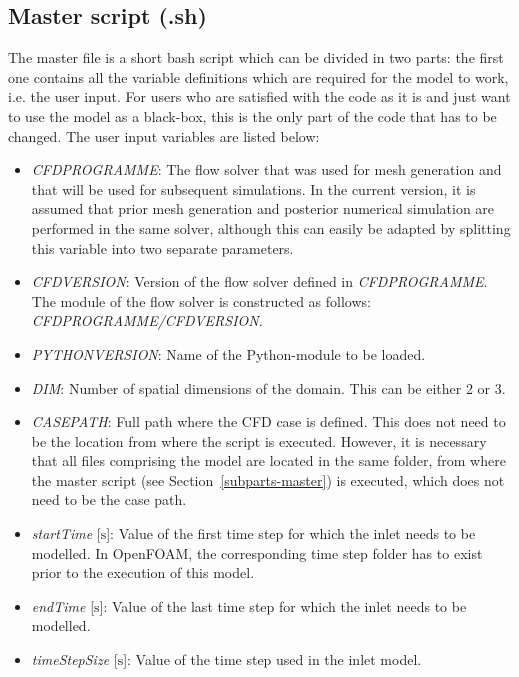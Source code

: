 \documentclass[fleqn,10pt,a4paper,twoside,english]{book}
\begin{document}
\subsection{Master script (.sh) \label{subparts-master}}
The master file is a short bash script which can be divided in two parts: the first one contains all the variable definitions which are required for the model to work, i.e. the user input. For users who are satisfied with the code as it is and just want to use the model as a black-box, this is the only part of the code that has to be changed. The user input variables are listed below:
\begin{itemize}
	\item{\textit{CFD\textunderscore PROGRAMME}: The flow solver that was used for mesh generation and that will be used for subsequent simulations. In the current version, it is assumed that prior mesh generation and posterior numerical simulation are performed in the same solver, although this can easily be adapted by splitting this variable into two separate parameters.}
	\item{\textit{CFD\textunderscore VERSION}: Version of the flow solver defined in \textit{CFD\textunderscore}\newline\textit{PROGRAMME}. The module of the flow solver is constructed as follows: \textit{CFD\textunderscore PROGRAMME/CFD\textunderscore VERSION}.}
	\item{\textit{PYTHON\textunderscore VERSION}: Name of the Python-module to be loaded.}
	\item{\textit{DIM}: Number of spatial dimensions of the domain. This can be either 2 or 3.}	
	\item{\textit{CASE\textunderscore PATH}: Full path where the CFD case is defined. This does not need to be the location from where the script is executed. However, it is necessary that all files comprising the model are located in the same folder, from where the master script (see \mbox{Section \ref{subparts-master}}) is executed, which does not need to be the case path.}	
	\item{\textit{startTime} [$\mathrm{s}$]: Value of the first time step for which the inlet needs to be modelled. In OpenFOAM, the corresponding time step folder has to exist prior to the execution of this model.}
	\item{\textit{endTime} [$\mathrm{s}$]: Value of the last time step for which the inlet needs to be modelled.}
	\item{\textit{timeStepSize} [$\mathrm{s}$]: Value of the time step used in the inlet model. }

\end{itemize}
\end{document}
